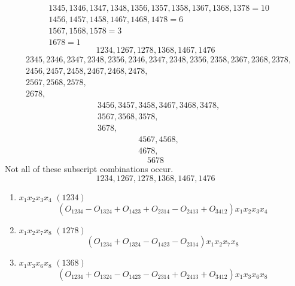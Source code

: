 \documentclass[aps,preprint]{revtex4}%
\begin{document}
\begin{enumerate}
\begin{align}
&  1345,1346,1347,1348,1356,1357,1358,1367,1368,1378=10\\
&  1456,1457,1458,1467,1468,1478=6\\
&  1567,1568,1578=3\\
&  1678=1
\end{align}%
\begin{equation}
1234,1267,1278,1368,1467,1476
\end{equation}%
\begin{align}
&  2345,2346,2347,2348,2356,2346,2347,2348,2356,2358,2367,2368,2378,\\
&  2456,2457,2458,2467,2468,2478,\\
&  2567,2568,2578,\\
&  2678,
\end{align}%
\begin{align}
&  3456,3457,3458,3467,3468,3478,\\
&  3567,3568,3578,\\
&  3678,
\end{align}%
\begin{align}
&  4567,4568,\\
&  4678,
\end{align}%
\begin{equation}
5678
\end{equation}
Not all of these subscript combinations occur.%
\begin{equation}
1234,1267,1278,1368,1467,1476
\end{equation}


\begin{enumerate}
\item $x_{1}x_{2}x_{3}x_{4}$ $\left(  1234\right)  $%
\begin{equation}
\left(  \overset{}{O_{1234}-O_{1324}+O_{1423}+O_{2314}-O_{2413}+O_{3412}%
}\right)  x_{1}x_{2}x_{3}x_{4}%
\end{equation}


\item $x_{1}x_{2}x_{7}x_{8}$ $\left(  1278\right)  $%
\begin{equation}
\left(  \overset{}{O_{1234}+O_{1324}-O_{1423}-O_{2314}}\right)  x_{1}%
x_{2}x_{7}x_{8}%
\end{equation}


\item $x_{1}x_{3}x_{6}x_{8}$ $\left(  1368\right)  $%
\begin{equation}
\left(  \overset{}{O_{1234}+O_{1324}-O_{1423}-O_{2314}+O_{2413}+O_{3412}%
}\right)  x_{1}x_{3}x_{6}x_{8}%
\end{equation}



\end{enumerate}
\end{enumerate}
\end{document}
